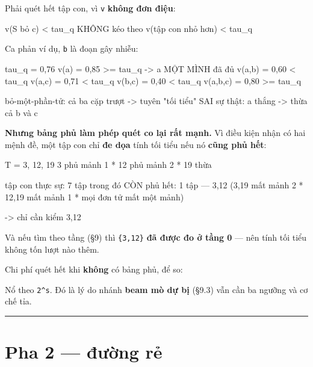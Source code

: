 \documentclass[11pt,a4paper]{article}
\begin{document}
Phải quét hết tập con, vì \texttt{v} \textbf{không đơn điệu}:

\begin{dia}
v(S bỏ {c}) < tau_q   KHÔNG kéo theo   v(tập con nhỏ hơn) < tau_q
\end{dia}

Ca phản ví dụ, \texttt{b} là đoạn gây nhiễu:

\begin{dia}
tau_q = 0,76
v({a})     = 0,85  >= tau_q      ->  {a} MỘT MÌNH đã đủ
v({a,b})   = 0,60  < tau_q
v({a,c})   = 0,71  < tau_q
v({b,c})   = 0,40  < tau_q
v({a,b,c}) = 0,80  >= tau_q

bỏ-một-phần-tử:  cả ba cặp trượt  ->  tuyên "tối tiểu"      SAI
sự thật:         {a} thắng        ->  thừa cả b và c
\end{dia}

\textbf{Nhưng bảng phủ làm phép quét co lại rất mạnh.} Vì điều kiện nhận có hai mệnh đề, một tập
con chỉ \textbf{đe dọa} tính tối tiểu nếu nó \textbf{cũng phủ hết}:

\begin{dia}
T = {3, 12, 19}      3 phủ mảnh 1 * 12 phủ mảnh 2 * 19 thừa

tập con thực sự:            7 tập
trong đó CÒN phủ hết:       1 tập  —  {3,12}
     ({3,19} mất mảnh 2 * {12,19} mất mảnh 1 * mọi đơn tử mất một mảnh)

->  chỉ cần kiểm {3,12}
\end{dia}

Và nếu tìm theo tầng (\S{}9) thì \texttt{\{3,12\}} \textbf{đã được đo ở tầng 0} — nên tính tối tiểu không tốn
lượt nào thêm.

Chi phí quét hết khi \textbf{không} có bảng phủ, để so:


Nổ theo \texttt{2\textasciicircum{}s}. Đó là lý do nhánh \textbf{beam mò dự bị} (\S{}9.3) vẫn cần ba ngưỡng và cơ chế tỉa.

\vspace{0.3em}\hrule\vspace{0.6em}

\section{Pha 2 — đường rẻ}
\end{document}

